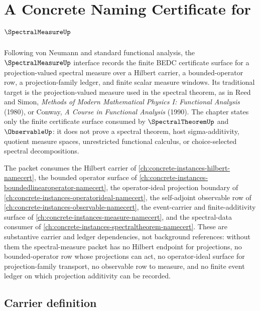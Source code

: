 \chapter{A Concrete Naming Certificate for $\SpectralMeasureUp$}
\label{ch:concrete-instances-spectral-measure-namecert}

Following von Neumann and standard functional analysis, the $\SpectralMeasureUp$ interface records the finite BEDC certificate surface for a projection-valued spectral measure over a Hilbert carrier, a bounded-operator row, a projection-family ledger, and finite scalar measure windows. Its traditional target is the projection-valued measure used in the spectral theorem, as in Reed and Simon, \emph{Methods of Modern Mathematical Physics I: Functional Analysis} (1980), or Conway, \emph{A Course in Functional Analysis} (1990). The chapter states only the finite certificate surface consumed by $\SpectralTheoremUp$ and $\ObservableUp$: it does not prove a spectral theorem, host sigma-additivity, quotient measure spaces, unrestricted functional calculus, or choice-selected spectral decompositions.

The packet consumes the Hilbert carrier of \autoref{ch:concrete-instances-hilbert-namecert}, the bounded operator surface of \autoref{ch:concrete-instances-boundedlinearoperator-namecert}, the operator-ideal projection boundary of \autoref{ch:concrete-instances-operatorideal-namecert}, the self-adjoint observable row of \autoref{ch:concrete-instances-observable-namecert}, the event-carrier and finite-additivity surface of \autoref{ch:concrete-instances-measure-namecert}, and the spectral-data consumer of \autoref{ch:concrete-instances-spectraltheorem-namecert}. These are substantive carrier and ledger dependencies, not background references: without them the spectral-measure packet has no Hilbert endpoint for projections, no bounded-operator row whose projections can act, no operator-ideal surface for projection-family transport, no observable row to measure, and no finite event ledger on which projection additivity can be recorded.

\section{Carrier definition}
\label{sec:spectralmeasure-carrier}

